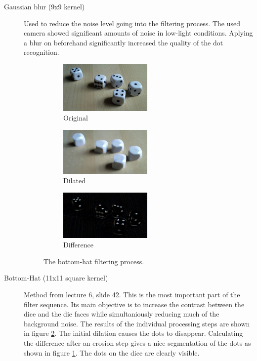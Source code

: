 \begin{description}
\item[Gaussian blur (9x9 kernel)] Used to reduce the noise level going into the filtering process. The used camera showed significant amounts of noise in low-light conditions. Aplying a blur on beforehand significantly increased the quality of the dot recognition.

\begin{figure}
	\centering
	\begin{subfigure}[b]{45mm}
		\includegraphics[width=45mm]{images/dies/original.png}
		\caption{Original}
	\end{subfigure}
	\hspace{0.5cm}
	\begin{subfigure}[b]{45mm}
		\includegraphics[width=45mm]{images/dies/dilated.png}
		\caption{Dilated}
	\end{subfigure}
	\hspace{0.5cm}
	\begin{subfigure}[b]{45mm}
		\includegraphics[width=45mm]{images/dies/difference.png}
		\caption{Difference}
		\label{fig:imgdiff}
	\end{subfigure}

	\caption{The bottom-hat filtering process.}
	\label{fig:bottomhat}
\end{figure}

\item[Bottom-Hat (11x11 square kernel)] Method from lecture 6, slide 42. This is the most important part of the filter sequence. Its main objective is to increase the contrast between the dice and the die faces while simultaniously reducing much of the background noise. The results of the individual processing steps are shown in figure \ref{fig:bottomhat}. The initial dilation causes the dots to disappear. Calculating the difference after an erosion step gives a nice segmentation of the dots as shown in figure \ref{fig:imgdiff}. The dots on the dice are clearly visible.


\end{description}
